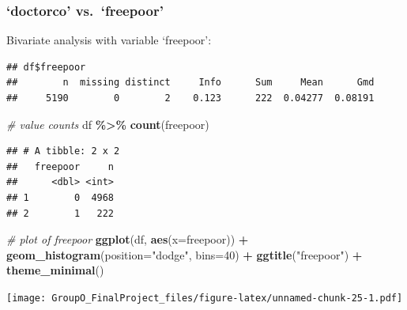 \documentclass[
]{article}
\newenvironment{Shaded}{\begin{snugshade}}{\end{snugshade}}
\newcommand{\AttributeTok}[1]{\textcolor[rgb]{0.13,0.29,0.53}{#1}}
\newcommand{\CommentTok}[1]{\textcolor[rgb]{0.56,0.35,0.01}{\textit{#1}}}
\newcommand{\DecValTok}[1]{\textcolor[rgb]{0.00,0.00,0.81}{#1}}
\newcommand{\FunctionTok}[1]{\textcolor[rgb]{0.13,0.29,0.53}{\textbf{#1}}}
\newcommand{\NormalTok}[1]{#1}
\newcommand{\OtherTok}[1]{\textcolor[rgb]{0.56,0.35,0.01}{#1}}
\newcommand{\SpecialCharTok}[1]{\textcolor[rgb]{0.81,0.36,0.00}{\textbf{#1}}}
\newcommand{\StringTok}[1]{\textcolor[rgb]{0.31,0.60,0.02}{#1}}
\begin{document}
\subsubsection{`doctorco' vs.~`freepoor'}\label{doctorco-vs.-freepoor}

Bivariate analysis with variable `freepoor':

\begin{Shaded}
\end{Shaded}

\begin{verbatim}
## df$freepoor 
##        n  missing distinct     Info      Sum     Mean      Gmd 
##     5190        0        2    0.123      222  0.04277  0.08191
\end{verbatim}

\begin{Shaded}
\begin{Highlighting}[]
\CommentTok{\# value counts}
\NormalTok{df }\SpecialCharTok{\%\textgreater{}\%} \FunctionTok{count}\NormalTok{(freepoor)}
\end{Highlighting}
\end{Shaded}

\begin{verbatim}
## # A tibble: 2 x 2
##   freepoor     n
##      <dbl> <int>
## 1        0  4968
## 2        1   222
\end{verbatim}

\begin{Shaded}
\begin{Highlighting}[]
\CommentTok{\# plot of freepoor}
\FunctionTok{ggplot}\NormalTok{(df, }\FunctionTok{aes}\NormalTok{(}\AttributeTok{x=}\NormalTok{freepoor)) }\SpecialCharTok{+}
  \FunctionTok{geom\_histogram}\NormalTok{(}\AttributeTok{position=}\StringTok{"dodge"}\NormalTok{, }\AttributeTok{bins=}\DecValTok{40}\NormalTok{) }\SpecialCharTok{+}
  \FunctionTok{ggtitle}\NormalTok{(}\StringTok{"freepoor"}\NormalTok{) }\SpecialCharTok{+}
  \FunctionTok{theme\_minimal}\NormalTok{()}
\end{Highlighting}
\end{Shaded}

\texttt{[image: GroupO\_FinalProject\_files/figure-latex/unnamed-chunk-25-1.pdf]}

\begin{Shaded}
\end{Shaded}
\end{document}
